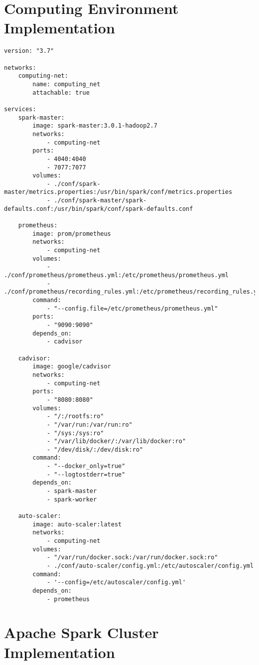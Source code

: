 \chapter{Computing Environment Implementation}

\begin{lstlisting}[label=lst:appendix_env_compose, caption=Computing environment docker-compose file]
version: "3.7"
 
networks:
    computing-net:
        name: computing_net
        attachable: true
 
services:
    spark-master:
        image: spark-master:3.0.1-hadoop2.7
        networks:
            - computing-net
        ports:
            - 4040:4040
            - 7077:7077
        volumes:
            - ./conf/spark-master/metrics.properties:/usr/bin/spark/conf/metrics.properties
            - ./conf/spark-master/spark-defaults.conf:/usr/bin/spark/conf/spark-defaults.conf
 
    prometheus:
        image: prom/prometheus
        networks:
            - computing-net
        volumes:
            - ./conf/prometheus/prometheus.yml:/etc/prometheus/prometheus.yml
            - ./conf/prometheus/recording_rules.yml:/etc/prometheus/recording_rules.yml
        command:
            - "--config.file=/etc/prometheus/prometheus.yml"
        ports:
            - "9090:9090"
        depends_on:
            - cadvisor
 
    cadvisor:
        image: google/cadvisor
        networks:
            - computing-net
        ports:
            - "8080:8080"
        volumes:
            - "/:/rootfs:ro"
            - "/var/run:/var/run:ro"
            - "/sys:/sys:ro"
            - "/var/lib/docker/:/var/lib/docker:ro"
            - "/dev/disk/:/dev/disk:ro"
        command:
            - "--docker_only=true"
            - "--logtostderr=true"
        depends_on:
            - spark-master
            - spark-worker
 
    auto-scaler:
        image: auto-scaler:latest
        networks:
            - computing-net
        volumes:
            - "/var/run/docker.sock:/var/run/docker.sock:ro"
            - ./conf/auto-scaler/config.yml:/etc/autoscaler/config.yml
        command:
            - '--config=/etc/autoscaler/config.yml'
        depends_on:
            - prometheus
\end{lstlisting}

\chapter{Apache Spark Cluster Implementation}

